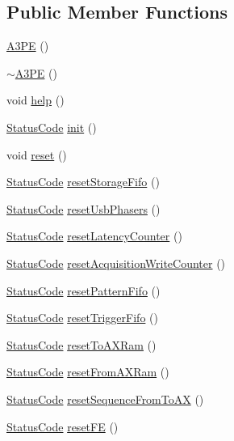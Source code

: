 \subsection*{Public Member Functions}
\begin{DoxyCompactItemize}
\item 
\hyperlink{classA3PE_ae3e49a43c661f5e9c1b0edaee14fc297}{A3\+PE} ()
\item 
\hyperlink{classA3PE_aab155e065b455ff439daf47a976399c3}{$\sim$\+A3\+PE} ()
\item 
void \hyperlink{classA3PE_ae495a413cc26d31321b31942ebef1bfa}{help} ()
\item 
\hyperlink{classStatusCode}{Status\+Code} \hyperlink{classA3PE_abe07bae8ce2f32926b7258f269ae655e}{init} ()
\item 
void \hyperlink{classA3PE_a449775588222d544aeeaab190d553652}{reset} ()
\item 
\hyperlink{classStatusCode}{Status\+Code} \hyperlink{classA3PE_a8e7074703227b118aa9230258f22b44c}{reset\+Storage\+Fifo} ()
\item 
\hyperlink{classStatusCode}{Status\+Code} \hyperlink{classA3PE_a0ad1110ea755ffd0b277284d807a8794}{reset\+Usb\+Phasers} ()
\item 
\hyperlink{classStatusCode}{Status\+Code} \hyperlink{classA3PE_a44c50d822ac4f5d8f2b8ed75c5b90580}{reset\+Latency\+Counter} ()
\item 
\hyperlink{classStatusCode}{Status\+Code} \hyperlink{classA3PE_a557ea9cfa97a03db1514af2fe8936df3}{reset\+Acquisition\+Write\+Counter} ()
\item 
\hyperlink{classStatusCode}{Status\+Code} \hyperlink{classA3PE_a4e5b677dd2872428abf3d64ef7a769c1}{reset\+Pattern\+Fifo} ()
\item 
\hyperlink{classStatusCode}{Status\+Code} \hyperlink{classA3PE_ac81388bd2988192cf54034b245f69891}{reset\+Trigger\+Fifo} ()
\item 
\hyperlink{classStatusCode}{Status\+Code} \hyperlink{classA3PE_a31f72fac5a0f00bcf3a0db99bd5704ee}{reset\+To\+A\+X\+Ram} ()
\item 
\hyperlink{classStatusCode}{Status\+Code} \hyperlink{classA3PE_aa10639563d06c0d09f3c0725710ff35d}{reset\+From\+A\+X\+Ram} ()
\item 
\hyperlink{classStatusCode}{Status\+Code} \hyperlink{classA3PE_a6015ba83a7b828efb1969291ab740eee}{reset\+Sequence\+From\+To\+AX} ()
\item 
\hyperlink{classStatusCode}{Status\+Code} \hyperlink{classA3PE_a2cfdb2f37d3d786cbe1ff42fef37b276}{reset\+FE} ()

\end{DoxyCompactItemize}
